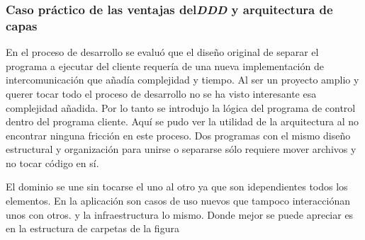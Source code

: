 \subsubsection{Caso práctico de las ventajas del\textit{DDD} y arquitectura de capas}

En el proceso de desarrollo se evaluó que el diseño original de separar el programa a ejecutar del cliente requería de una nueva implementación de intercomunicación que añadía complejidad y tiempo. Al ser un proyecto amplio y querer tocar todo el proceso de desarrollo no se ha visto interesante esa complejidad añadida. Por lo tanto se introdujo la lógica del programa de control dentro del programa cliente. Aquí se pudo ver la utilidad de la arquitectura al no encontrar ninguna fricción en este proceso. Dos programas con el mismo diseño estructural y organización para unirse o separarse sólo requiere mover archivos y no tocar código en sí.

El dominio se une sin tocarse el uno al otro ya que son idependientes todos los elementos. En la aplicación son casos de uso nuevos que tampoco interacciónan unos con otros. y la infraestructura lo mismo. Donde mejor se puede apreciar es en la estructura de carpetas de la figura

